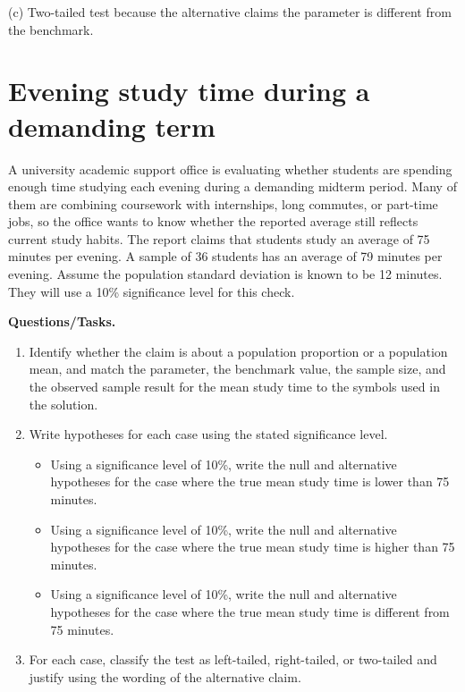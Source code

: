 \begin{ExamProblems}
		(c) Two-tailed test because the alternative claims the parameter is different from the benchmark.\TwoTailGraph
		
		\item
		\section{Evening study time during a demanding term}
		A university academic support office is evaluating whether students are spending enough time studying each evening during a demanding midterm period. Many of them are combining coursework with internships, long commutes, or part-time jobs, so the office wants to know whether the reported average still reflects current study habits. The report claims that students study an average of 75 minutes per evening. A sample of 36 students has an average of 79 minutes per evening. Assume the population standard deviation is known to be 12 minutes. They will use a 10\% significance level for this check.
		
		\textbf{Questions/Tasks.}
		\begin{enumerate}
			\item[(C1)] Identify whether the claim is about a population proportion or a population mean, and match the parameter, the benchmark value, the sample size, and the observed sample result for the mean study time to the symbols used in the solution.
			\item[(C2)] Write hypotheses for each case using the stated significance level.
			\begin{itemize}
				\item[(a)] Using a significance level of 10\%, write the null and alternative hypotheses for the case where the true mean study time is lower than 75 minutes.
				\item[(b)] Using a significance level of 10\%, write the null and alternative hypotheses for the case where the true mean study time is higher than 75 minutes.
				\item[(c)] Using a significance level of 10\%, write the null and alternative hypotheses for the case where the true mean study time is different from 75 minutes.
			\end{itemize}
			\item[(C3)] For each case, classify the test as left-tailed, right-tailed, or two-tailed and justify using the wording of the alternative claim.
		\end{enumerate}
		

\end{ExamProblems}
